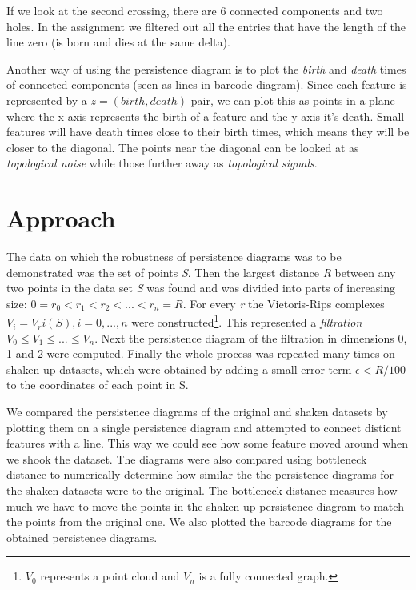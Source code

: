 \documentclass[11pt]{article}
\begin{document}
If we look at the second crossing, there are 6 connected components and two holes. In the assignment we filtered out all the entries that have the length of the line zero (is born and dies at the same delta).

Another way of using the persistence diagram is to plot the \emph{birth} and \emph{death} times of connected components (seen as lines in barcode diagram). Since each feature is represented by a $z = (birth, death)$ pair, we can plot this as points in a plane where the x-axis represents the birth of a feature and the y-axis it's death. Small features will have death times close to their birth times, which means they will be closer to the diagonal. The points near the diagonal can be looked at as \emph{topological noise} while those further away as \emph{topological signals}.


\section{Approach}

The data on which the robustness of persistence diagrams was to be demonstrated was the set of points \emph{S}. Then the largest distance \emph{R} between any two points in the data set \emph{S} was found and was divided into parts of increasing size: $0 = r_0 < r_1 < r_2 < ... < r_n = R$. For every \emph{r} the Vietoris-Rips complexes $V_i = V_ri(S), i = 0,...,n$ were constructed\footnote{$V_0$ represents a point cloud and $V_n$ is a fully connected graph.}. This represented a \emph{filtration} $V_0 \leq V_1 \leq ... \leq V_n$. Next the persistence diagram of the filtration in dimensions 0, 1 and 2 were computed. Finally the whole process was repeated many times on shaken up datasets, which were obtained by adding a small error term $\epsilon < R/100$ to the coordinates of each point in S.

We compared the persistence diagrams of the original and shaken datasets by plotting them on a single persistence diagram and attempted to connect disticnt features with a line. This way we could see how some feature moved around when we shook the dataset. The diagrams were also compared using bottleneck distance to numerically determine how similar the the persistence diagrams for the shaken datasets were to the original. The bottleneck distance measures how much we have to move the points in the shaken up persistence diagram to match the points from the original one. We also plotted the barcode diagrams for the obtained persistence diagrams.
\end{document}
